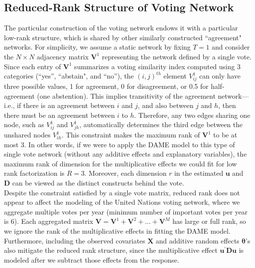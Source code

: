 \documentclass[a4paper]{article}
\begin{document}
\begin{appendices}
\section{Reduced-Rank Structure of Voting Network}\label{appendix: reduced rank}
The particular construction of the voting network endows it with a particular low-rank structure, which is shared by other similarly constructed ``agreement" networks. For simplicity, we assume a static network by fixing $T = 1$ and consider the $N \times N$ adjacency matrix $\mathbf{V}^1$ representing the network defined by a single vote. Since each entry of $\mathbf{V}^1$ summarizes a voting similarity index computed using 3 categories (“yes”, ``abstain", and “no”), the $(i, j)^{th}$ element $V^1_{ij}$ can only have three possible values, 1 for agreement, 0 for disagreement, or 0.5 for half-agreement (one abstention). This implies transitivity of the agreement network---i.e., if there is an agreement between $i$ and $j$, and also between $j$ and $h$, then there must be an agreement between $i$ to $h$. Therefore, any two edges sharing one node, such as $V^1_{ij}$ and $V^1_{jh}$, automatically determines the third edge between the unshared nodes $V^1_{ih}$. This constraint makes the maximum rank of $\mathbf{V}^1$ to be at most 3. In other words, if we were to apply the DAME model to this type of single vote network (without any additive effects and explanatory variables), the maximum rank of dimension for the multiplicative effects we could fit for low rank factorization is $R=3$. Moreover, each dimension $r$ in the estimated $\boldsymbol{u}$ and $\mathbf{D}$ can be viewed as the distinct constructs behind the vote. \\ \newline
Despite the constraint satisfied by a single vote matrix, reduced rank does not appear to affect the modeling of the United Nations voting network, where we aggregate multiple votes per year (minimum number of important votes per year is 6). Each aggregated matrix $\mathbf{V} = \mathbf{V}^1+\mathbf{V}^2+...+\mathbf{V}^M$ has large or full rank, so we ignore the rank of the multiplicative effects in fitting the DAME model. Furthermore, including the observed covariates $\mathbf{X}$ and additive random effects $\boldsymbol{\theta}$'s also mitigate the reduced rank structure, since the multiplicative effect $\boldsymbol{u}^\prime \mathbf{D}\boldsymbol{u}$ is modeled after we subtract those effects from the response.

\end{appendices}
\end{document}
